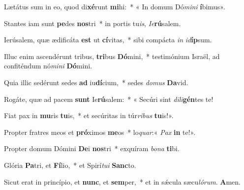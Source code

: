 \item Lætátus sum in eo, quod di\textbf{xé}runt \textbf{mi}hi:~* « In domum Dó\textit{mi}\textit{ni} \textbf{í}bimus».

\item Stantes iam sunt \textbf{pe}des \textbf{nos}tri~* in portis tu\textit{is}, \textit{Ie}\textbf{rú}salem.

\item Ierúsalem, quæ ædificáta \textbf{est} ut \textbf{cí}vitas,~* sibi compácta \textit{in} \textit{id}\textbf{íp}sum.

\item Illuc enim ascendérunt tribus, \textbf{tri}bus \textbf{Dó}mini,~* testimónium Israël, ad confiténdum nó\textit{mi}\textit{ni} \textbf{Dó}mini.

\item Quia illic sedérunt sedes \textbf{ad} iu\textbf{dí}cium,~* sedes \textit{do}\textit{mus} \textbf{Da}vid.

\item Rogáte, quæ ad pacem \textbf{sunt} Ie\textbf{rú}salem:~* « Secúri sint \textit{di}\textit{li}\textbf{gén}tes te!

\item Fiat pax in \textbf{mu}ris \textbf{tu}is,~* et secúritas in túr\textit{ri}\textit{bus} \textbf{tu}is!».

\item Propter fratres meos et \textbf{pró}ximos \textbf{me}os~* lo\textit{quar}:« \textit{Pax} \textbf{in} te!».

\item Propter domum Dómini \textbf{De}i \textbf{nos}tri~* exquíram \textit{bo}\textit{na} \textbf{ti}bi.

\item Glória \textbf{Pa}tri, et \textbf{Fí}lio,~* et Spirí\textit{tu}\textit{i} \textbf{Sanc}to.

\item Sicut erat in princípio, et \textbf{nunc}, et \textbf{sem}per,~* et in sǽcula sæcu\textit{ló}\textit{rum}. \textbf{A}men.